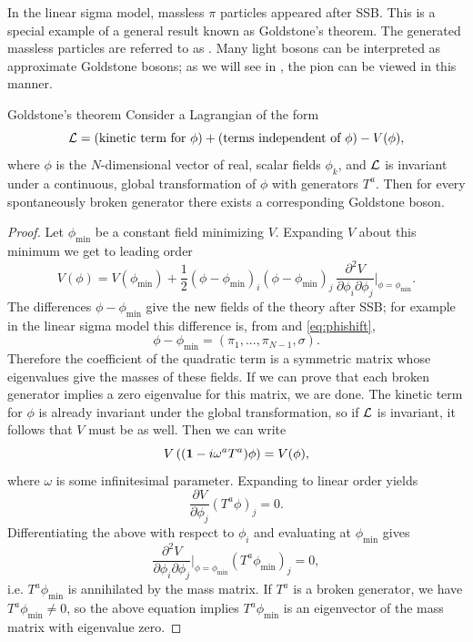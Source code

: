 In the linear sigma model, massless $\pi$ particles appeared after
SSB. This is a special example of a general result
known as Goldstone's theorem. The generated massless particles are
referred to as . 
Many light bosons can be interpreted
as approximate Goldstone bosons; as we will see in ,
the pion can be viewed in this manner.
\begin{theorem}{Goldstone's theorem}{}
Consider a Lagrangian of the form
$$
  \mathcal{L}=(\text{kinetic term for $\phi$})+
        (\text{terms independent of $\phi$})-V(\phi),
$$
where $\phi$ is the $N$-dimensional vector of real, scalar fields
$\phi_k$, and $\mathcal{L}$ is invariant under a continuous, global
transformation of $\phi$ with generators $T^a$. Then for every
spontaneously broken generator there exists a corresponding
Goldstone boson. 
\begin{proof}
  Let $\phi_\text{min}$ be a constant field minimizing $V$. Expanding
  $V$ about this minimum we get to leading order
  $$
    V(\phi)= V(\phi_\text{min})
     +\frac{1}{2}
      (\phi-\phi_\text{min})_i(\phi-\phi_\text{min})_j\,
      \frac{\partial^2 V}{\partial\phi_i\partial\phi_j}
       \Big|_{\phi=\phi_\text{min}}.
  $$
  The differences $\phi-\phi_\text{min}$ give the new fields of the
  theory after SSB; for example in the linear sigma model this difference
  is, from  and \eqref{eq:phishift},
  $$
    \phi-\phi_\text{min}=(\pi_1,...,\pi_{N-1},\sigma).
  $$
  Therefore the coefficient of the quadratic term is a symmetric matrix
  whose eigenvalues give the masses of these fields. If we can prove
  that each broken generator implies a zero eigenvalue for this matrix,
  we are done.
  The kinetic term for $\phi$ is already invariant under the global
  transformation, so if $\mathcal{L}$ is invariant, it follows that $V$ must
  be as well. Then we can write
  $$
    V\left(({\mathbf 1}-i\omega^aT^a)\phi\right)=V(\phi),
  $$
  where $\omega$ is some infinitesimal parameter. Expanding to linear
  order yields
  $$
    \frac{\partial V}{\partial\phi_j}(T^a\phi)_j=0.
  $$
  Differentiating the above with respect to $\phi_i$ and evaluating at
  $\phi_\text{min}$ gives
  $$
     \frac{\partial^2 V}{\partial\phi_i\partial\phi_j}
      \Big|_{\phi=\phi_\text{min}}(T^a\phi_\text{min})_j=0,
  $$
  i.e. $T^a\phi_\text{min}$ is annihilated by the mass matrix. 
  If $T^a$ is a broken generator, we have $T^a\phi_\text{min}\neq0$,
  so the above equation implies $T^a\phi_\text{min}$ is an
  eigenvector of the mass matrix with eigenvalue zero.
\end{proof}
\end{theorem}




